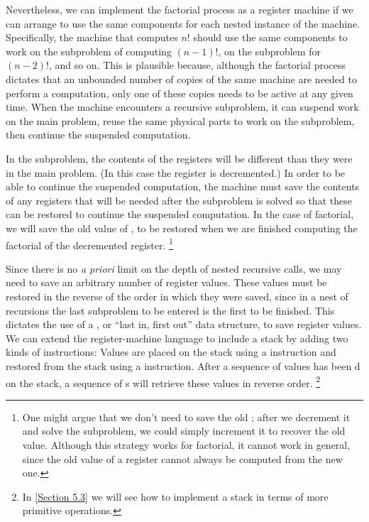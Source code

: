 Nevertheless, we can implement the factorial process as a register machine if we can arrange to use the same components for each nested instance of the machine.
Specifically, the machine that computes \( n! \) should use the same components to work on the subproblem of computing \( (n - 1)! \), on the subproblem for \( (n - 2)! \), and so on.
This is plausible because, although the factorial process dictates that an unbounded number of copies of the same machine are needed to perform a computation, only one of these copies needs to be active at any given time.
When the machine encounters a recursive subproblem, it can suspend work on the main problem, reuse the same physical parts to work on the subproblem, then continue the suspended computation.

In the subproblem, the contents of the registers will be different than they were in the main problem.
(In this case the  register is decremented.)
In order to be able to continue the suspended computation, the machine must save the contents of any registers that will be needed after the subproblem is solved so that these can be restored to continue the suspended computation.
In the case of factorial, we will save the old value of , to be restored when we are finished computing the factorial of the decremented  register.%
\footnote{
	One might argue that we don’t need to save the old ;
	after we decrement it and solve the subproblem, we could simply increment it to recover the old value.
	Although this strategy works for factorial, it cannot work in general, since the old value of a register cannot always be computed from the new one.
}

Since there is no \emph{a priori} limit on the depth of nested recursive calls, we may need to save an arbitrary number of register values.
These values must be restored in the reverse of the order in which they were saved, since in a nest of recursions the last subproblem to be entered is the first to be finished.
This dictates the use of a , or “last in, first out” data structure, to save register values.
We can extend the register-machine language to include a stack by adding two kinds of instructions:
Values are placed on the stack using a  instruction and restored from the stack using a  instruction.
After a sequence of values has been d on the stack, a sequence of s will retrieve these values in reverse order.%
\footnote{
	In \cref{Section 5.3} we will see how to implement a stack in terms of more primitive operations.
}

